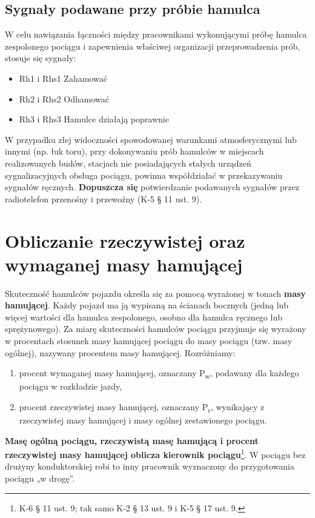 \section{Sygnały podawane przy próbie hamulca}

W celu nawiązania łączności między pracownikami wykonującymi próbę hamulca zespolonego pociągu i zapewnienia właściwej organizacji przeprowadzenia prób, stosuje się sygnały:

\begin{itemize}
	\item Rh1 i Rhs1 Zahamować
	\item Rh2 i Rhs2 Odhamować
	\item Rh3 i Rhs3 Hamulce działają poprawnie
\end{itemize}


W przypadku złej widoczności spowodowanej warunkami atmosferycznymi lub innymi (np. łuk toru), przy dokonywaniu prób hamulców w miejscach realizowanych budów, stacjach nie posiadających stałych urządzeń sygnalizacyjnych obsługa pociągu, powinna współdziałać w przekazywaniu sygnałów ręcznych. \textbf{Dopuszcza się} potwierdzanie podawanych sygnałów przez radiotelefon przenośny i przewoźny (K-5 § 11 ust. 9).

\chapter{Obliczanie rzeczywistej oraz wymaganej masy hamującej}
Skuteczność hamulców pojazdu określa się za pomocą wyrażonej w tonach \textbf{masy hamującej}. Każdy pojazd ma ją wypisaną na ścianach bocznych (jedną lub więcej wartości dla hamulca zespolonego, osobno dla hamulca ręcznego lub sprężynowego). Za miarę skuteczności hamulców pociągu przyjmuje się wyrażony w procentach stosunek masy hamującej pociągu do masy pociągu (tzw. masy ogólnej), nazywany procentem masy hamującej. Rozróżniamy:
\begin{enumerate}
	\item procent wymaganej masy hamującej, oznaczany P\textsubscript{w}, podawany dla każdego pociągu w rozkładzie jazdy,
	\item procent rzeczywistej masy hamującej, oznaczany P\textsubscript{r}, wynikający z rzeczywistej masy hamującej i masy ogólnej zestawionego pociągu.
\end{enumerate}

\textbf{Masę ogólną pociągu, rzeczywistą masę hamującą i procent rzeczywistej masy hamującej oblicza kierownik pociągu}\footnote{K-6 § 11 ust. 9; tak samo K-2 § 13 ust. 9 i K-5 § 17 ust. 9.}. W pociągu bez drużyny konduktorskiej robi to inny pracownik wyznaczony do przygotowania pociągu „w drogę”.

